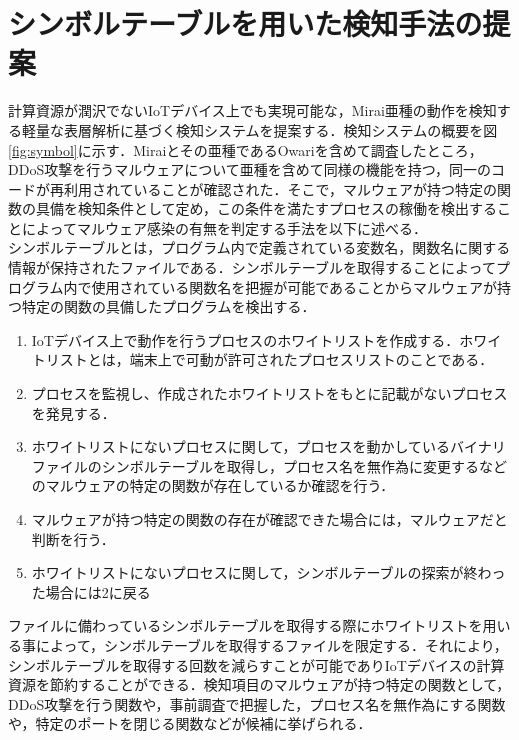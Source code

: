 \section{シンボルテーブルを用いた検知手法の提案}
計算資源が潤沢でないIoTデバイス上でも実現可能な，Mirai亜種の動作を検知する軽量な表層解析に基づく検知システムを提案する．検知システムの概要を図\ref{fig:symbol}に示す．Miraiとその亜種であるOwariを含めて調査したところ，DDoS攻撃を行うマルウェアについて亜種を含めて同様の機能を持つ，同一のコードが再利用されていることが確認された．そこで，マルウェアが持つ特定の関数の具備を検知条件として定め，この条件を満たすプロセスの稼働を検出することによってマルウェア感染の有無を判定する手法を以下に述べる．\\
シンボルテーブルとは，プログラム内で定義されている変数名，関数名に関する情報が保持されたファイルである．シンボルテーブルを取得することによってプログラム内で使用されている関数名を把握が可能であることからマルウェアが持つ特定の関数の具備したプログラムを検出する．

\begin{enumerate}
 \item IoTデバイス上で動作を行うプロセスのホワイトリストを作成する．ホワイトリストとは，端末上で可動が許可されたプロセスリストのことである．
 \item プロセスを監視し、作成されたホワイトリストをもとに記載がないプロセスを発見する．
 \item ホワイトリストにないプロセスに関して，プロセスを動かしているバイナリファイルのシンボルテーブルを取得し，プロセス名を無作為に変更するなどのマルウェアの特定の関数が存在しているか確認を行う．
\item マルウェアが持つ特定の関数の存在が確認できた場合には，マルウェアだと判断を行う．
 \item ホワイトリストにないプロセスに関して，シンボルテーブルの探索が終わった場合には2に戻る
\end{enumerate}

ファイルに備わっているシンボルテーブルを取得する際にホワイトリストを用いる事によって，シンボルテーブルを取得するファイルを限定する．それにより，シンボルテーブルを取得する回数を減らすことが可能でありIoTデバイスの計算資源を節約することができる．検知項目のマルウェアが持つ特定の関数として，DDoS攻撃を行う関数や，事前調査で把握した，プロセス名を無作為にする関数や，特定のポートを閉じる関数などが候補に挙げられる．
 
